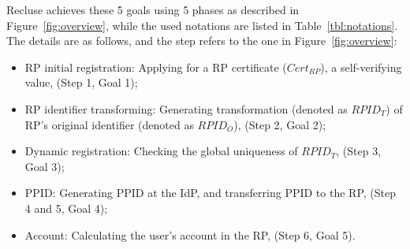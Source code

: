 Recluse achieves these 5 goals using 5 phases as described in Figure~\ref{fig:overview}, while the used notations are listed in Table~\ref{tbl:notations}. The details are as follows, and the step refers to the one in Figure~\ref{fig:overview}:
\begin{itemize}
  \item RP initial registration: Applying for a RP certificate ($Cert_{RP}$), a self-verifying value,  (Step 1, Goal 1);
  \item RP identifier transforming: Generating transformation (denoted as $RPID_T$) of RP's original identifier (denoted as $RPID_O$), (Step 2, Goal 2);
  \item Dynamic registration: Checking the global uniqueness of $RPID_T$, (Step 3, Goal 3);
  \item PPID:  Generating PPID at the IdP, and transferring PPID to the RP, (Step 4 and 5, Goal 4);
  \item Account: Calculating the user's account in the RP, (Step 6, Goal 5).
\end{itemize}


